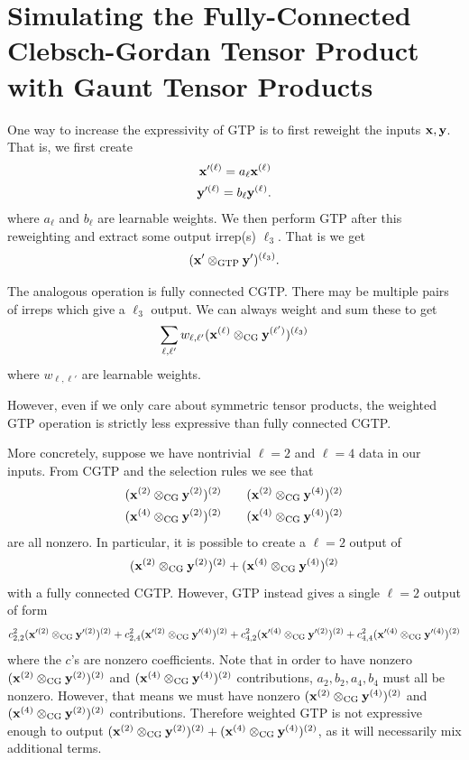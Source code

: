\section{Simulating the Fully-Connected Clebsch-Gordan Tensor Product with Gaunt Tensor Products}
\label{sec:simulate_TP_Gaunt}

One way to increase the expressivity of GTP is to first reweight the inputs $\mathbf{x},\mathbf{y}$. That is, we first create
\begin{align}
    \mathbf{x}'^{(\ell)}=a_{\ell}\mathbf{x}^{(\ell_{})}\\
    \mathbf{y}'^{(\ell)}=b_{\ell}\mathbf{y}^{(\ell_{})}.
\end{align}
where $a_\ell$ and $b_\ell$ are learnable weights. We then perform GTP after this reweighting and extract some output irrep(s) $\ell_3$. That is we get
\begin{align}
    (\mathbf{x}'\otimes_{\mathrm{GTP}} \mathbf{y}')^{(\ell_3)}.
\end{align}

The analogous operation is fully connected CGTP. There may be multiple pairs of irreps which give a $\ell_3$ output. We can always weight and sum these to get
\begin{align}
    \sum_{\ell,\ell'}w_{\ell,\ell'}( {\mathbf{x}^{(\ell_{})}} \otimes_{\mathrm{CG}} \mathbf{y}^{(\ell')})^{(\ell_3)}
\end{align}
where $w_{\ell,\ell'}$ are learnable weights.

However, even if we only care about symmetric tensor products, the weighted GTP operation is strictly less expressive than fully connected CGTP.

More concretely, suppose we have nontrivial $\ell=2$ and $\ell=4$ data in our inputs. From CGTP and the selection rules we see that 
\begin{align}
    (\mathbf{x}^{(2)}\otimes_{\mathrm{CG}}\mathbf{y}^{(2)})^{(2)}\qquad
    (\mathbf{x}^{(2)}\otimes_{\mathrm{CG}}\mathbf{y}^{(4)})^{(2)}\\
    (\mathbf{x}^{(4)}\otimes_{\mathrm{CG}}\mathbf{y}^{(2)})^{(2)}\qquad
    (\mathbf{x}^{(4)}\otimes_{\mathrm{CG}}\mathbf{y}^{(4)})^{(2)}
\end{align}
are all nonzero. In particular, it is possible to create a $\ell=2$ output of 
\[(\mathbf{x}^{(2)}\otimes_{\mathrm{CG}}\mathbf{y}^{(2)})^{(2)}+(\mathbf{x}^{(4)}\otimes_{\mathrm{CG}}\mathbf{y}^{(4)})^{(2)}\]
with a fully connected CGTP. However, GTP instead gives a single $\ell=2$ output of form
\begin{align}
    c^2_{2,2}(\mathbf{x}'^{(2)}\otimes_{\mathrm{CG}}\mathbf{y}'^{(2)})^{(2)}
    +c^2_{2,4}(\mathbf{x}'^{(2)}\otimes_{\mathrm{CG}}\mathbf{y}'^{(4)})^{(2)}
    +c^2_{4,2}(\mathbf{x}'^{(4)}\otimes_{\mathrm{CG}}\mathbf{y}'^{(2)})^{(2)}
    +c^2_{4,4}(\mathbf{x}'^{(4)}\otimes_{\mathrm{CG}}\mathbf{y}'^{(4)})^{(2)}
\end{align}
where the $c$'s are nonzero coefficients. Note that in order to have nonzero $(\mathbf{x}^{(2)}\otimes_{\mathrm{CG}}\mathbf{y}^{(2)})^{(2)}$ and $(\mathbf{x}^{(4)}\otimes_{\mathrm{CG}}\mathbf{y}^{(4)})^{(2)}$ contributions, $a_2,b_2,a_4,b_4$ must all be nonzero. However, that means we must have nonzero $(\mathbf{x}^{(2)}\otimes_{\mathrm{CG}}\mathbf{y}^{(4)})^{(2)}$ and $(\mathbf{x}^{(4)}\otimes_{\mathrm{CG}}\mathbf{y}^{(2)})^{(2)}$ contributions. Therefore weighted GTP is not expressive enough to output  $(\mathbf{x}^{(2)}\otimes_{\mathrm{CG}}\mathbf{y}^{(2)})^{(2)}+(\mathbf{x}^{(4)}\otimes_{\mathrm{CG}}\mathbf{y}^{(4)})^{(2)}$, as it will necessarily mix additional terms.